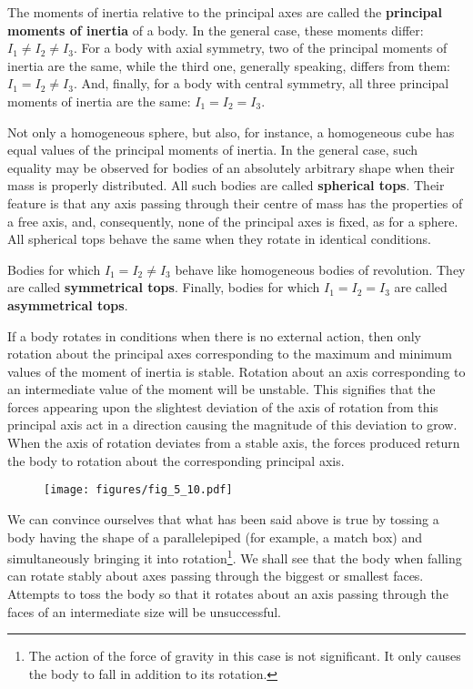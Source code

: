 The moments of inertia relative to the principal axes are called the \textbf{principal moments of inertia} of a body. In the general case, these moments differ: $I_1\neq I_2\neq I_3$. For a body with axial symmetry, two of the principal moments of inertia are the same, while the third one, generally speaking, differs from them: $I_1=I_2\neq I_3$. And, finally, for a body with central symmetry, all three principal moments of inertia are the same: $I_1=I_2=I_3$.

Not only a homogeneous sphere, but also, for instance, a homogeneous cube has equal values of the principal moments of inertia. In the general case, such equality may be observed for bodies of an absolutely arbitrary shape when their mass is properly distributed. All such bodies are called \textbf{spherical tops}. Their feature is that any axis passing through their centre of mass has the properties of a free axis, and, consequently, none of the principal axes is fixed, as for a sphere. All spherical tops behave the same when they rotate in identical conditions.

Bodies for which $I_1=I_2\neq I_3$ behave like homogeneous bodies of revolution. They are called \textbf{symmetrical tops}. Finally, bodies for which $I_1=I_2=I_3$ are called \textbf{asymmetrical tops}.

If a body rotates in conditions when there is no external action, then only rotation about the principal axes corresponding to the maximum and minimum values of the moment of inertia is stable. Rotation about an axis corresponding to an intermediate value of the moment will be unstable. This signifies that the forces appearing upon the slightest deviation of the axis of rotation from this principal axis act in a direction causing the magnitude of this deviation to grow. When the axis of rotation deviates from a stable axis, the forces produced return the body to rotation about the corresponding principal axis.

\begin{figure}[t]
	\begin{center}
		\texttt{[image: figures/fig\_5\_10.pdf]}
		\caption[]{}
		\label{fig:5_10}
	\end{center}
\vspace{-1.0cm}
\end{figure}

We can convince ourselves that what has been said above is true by tossing a body having the shape of a parallelepiped (for example, a match box) and simultaneously bringing it into rotation\footnote{The action of the force of gravity in this case is not significant. It only causes the body to fall in addition to its rotation.}. We shall see that the body when falling can rotate stably about axes passing through the biggest or smallest faces. Attempts to toss the body so that it rotates about an axis passing through the faces of an intermediate size will be unsuccessful.

